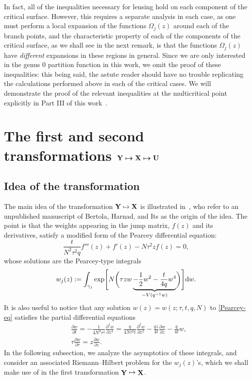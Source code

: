 \documentclass[pdftex]{sigma}
\DeclareMathOperator{\YY}{{\bf Y}}
\DeclareMathOperator{\XX}{{\bf X}}
\numberwithin{equation}{section}
\begin{document}
\fi

\begin{Remark} In fact, all of the inequalities necessary for lensing hold on each
component of the critical surface. However, this requires a separate analysis in each case, as one must perform a local expansion
of the functions $\Omega_j(z)$ around each of the branch points, and the characteristic property of each of the components of the
critical surface, as we shall see in the next remark, is that the functions $\Omega_j(z)$ have \textit{different} expansions in these
regions in general. Since we are only interested in the genus $0$ partition function in this work, we omit the proof of these inequalities: this being said, the astute reader should have no trouble replicating the calculations performed above in each of the critical cases. We will demonstrate the proof of the relevant inequalities at the multicritical point explicitly in Part III of this work~\cite{DHL3}.
\end{Remark}

\section[The first and second transformations ${\bf Y} \mapsto {\bf X} \mapsto {\bf U}$]{The first and second transformations $\boldsymbol{{\bf Y} \mapsto {\bf X} \mapsto {\bf U}}$}\label{section4}

\subsection{Idea of the transformation}
The main idea of the transformation ${\bf Y} \mapsto {\bf X}$ is illustrated in~\cite{DK1}, who refer to an unpublished manuscript of Bertola, Harnad, and Its
as the origin of the idea. The point is that the weights appearing in the jump matrix, $f(z)$ and its derivatives, satisfy a modified form of the Pearcey differential equation:
 \begin{equation} \label{Pearcey-eq}
 \frac{t}{N^2\tau^2 q} f'''(z) + f'(z) - N\tau^2 z f(z) = 0,
 \end{equation}
whose solutions are the Pearcey-type integrals
 \begin{equation*}
 w_j(z) := \int_{\gamma_j} \exp\Biggl[ N\biggl(\tau z w \underbrace{-\frac{1}{2}w^2 - \frac{t}{4q}w^4}_{-V(q^{-1}w)} \biggr)\Biggr] {\rm d}w.
 \end{equation*}
It is also useful to notice that any solution $w(z) = w(z;\tau,t,q,N)$ to \eqref{Pearcey-eq} satisfies the partial differential equations
 \begin{align*}
 &\frac{\partial w}{\partial t}= -\frac{1}{4 N^3\tau^4} \frac{\partial^4 w}{\partial z^4} = \frac{q}{4N\tau^2 t} \frac{\partial^2 w }{\partial z^2} - \frac{qz}{4t}\frac{\partial w }{\partial z} - \frac{q}{4t} w,\\
 &\tau\frac{\partial w}{\partial \tau}= z\frac{\partial w}{\partial z}.
 \end{align*}
In the following subsection, we analyze the asymptotics of these integrals, and consider an associated Riemann--Hilbert problem for the $w_j(z)$'s, which we shall make use of in the first transformation $\YY \mapsto \XX$.
\end{document}
